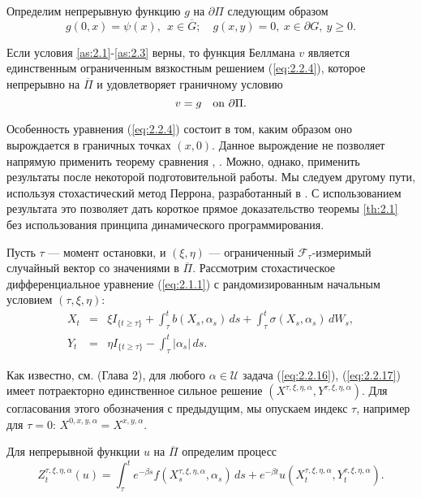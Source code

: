 Определим непрерывную функцию $g$ на $\partial\Pi$ следующим образом
\begin{equation} \label{eq:2.2.14}
g(0,x)=\psi(x),\ \ x\in\overline G;\quad g(x,y)=0,\ x\in\partial G,\ y\ge 0.
\end{equation}
\begin{theorem} \label{th:2.1}
Если условия \ref{as:2.1}-\ref{as:2.3} верны, то функция Беллмана $v$ является единственным ограниченным вязкостным решением (\ref{eq:2.2.4}), которое непрерывно на $\overline\Pi$ и удовлетворяет граничному условию
\begin{equation} \label{eq:2.2.15}
v=g\quad \textnormal{on\ } \partial\Pi.
\end{equation}
\end{theorem}

Особенность уравнения (\ref{eq:2.2.4}) состоит в том, каким образом оно вырождается в граничных точках $(x,0)$. Данное вырождение не позволяет напрямую применить теорему сравнения \cite[теорема 2.1]{BarRou98}, \cite[теорема 2.1]{Cha04}. Можно, однако, применить результаты \cite{MotSar08a} после некоторой подготовительной работы. Мы следуем другому пути, используя стохастический метод Перрона, разработанный в \cite{BaySir13}. С использованием результата \cite{Rok14} это позволяет дать короткое прямое доказательство теоремы \ref{th:2.1} без использования принципа динамического программирования.

Пусть $\tau$ --- момент остановки, и $(\xi,\eta)$ --- ограниченный $\mathscr F_\tau$-измеримый случайный вектор со значениями в $\overline\Pi$. Рассмотрим стохастическое дифференциальное уравнение (\ref{eq:2.1.1}) с рандомизированным начальным условием $(\tau,\xi,\eta)$:
\begin{eqnarray}
X_t &=&\xi I_{\{t\ge\tau\}}+\int_\tau^t b(X_s,\alpha_s)\,ds+\int_\tau^t \sigma(X_s,\alpha_s)\,dW_s, \label{eq:2.2.16}\\
Y_t &=&\eta I_{\{t\ge\tau\}}-\int_\tau^t|\alpha_s|\,ds. \label{eq:2.2.17}
\end{eqnarray}

Как известно, см. \cite{Kry80} (Глава 2), для любого $\alpha\in\mathcal U$ задача (\ref{eq:2.2.16}), (\ref{eq:2.2.17}) имеет потраекторно единственное сильное решение  $(X^{\tau,\xi,\eta,\alpha},Y^{\tau,\xi,\eta,\alpha})$. Для согласования этого обозначения с предыдущим, мы опускаем индекс $\tau$, например для $\tau=0$: $X^{0,x,y,\alpha}=X^{x,y,\alpha}$.

Для непрерывной функции $u$ на $\overline\Pi$ определим процесс
$$ Z^{\tau,\xi,\eta,\alpha}_t(u)=\int_\tau^t e^{-\beta s} f(X^{\tau,\xi,\eta,\alpha}_s,\alpha_s)\,ds +e^{-\beta t} u(X^{\tau,\xi,\eta,\alpha}_t,Y^{\tau,\xi,\eta,\alpha}_t).$$

